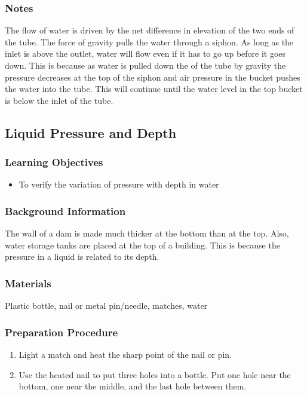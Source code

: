\subsubsection*{Notes}
The flow of water is driven by the net difference in elevation of the two ends of the tube. The force of gravity pulls the water through a siphon. As long as the inlet is above the outlet, water will flow even if it has to go up before it goes down. This is because as water is pulled down the of the tube by gravity the pressure decreases at the top of the siphon and air pressure in the bucket pushes the water into the tube. This will continue until the water level in the top bucket is below the inlet of the tube.

\subsection{Liquid Pressure and Depth}

\subsubsection*{Learning Objectives}
\begin{itemize}
\item{To verify the variation of pressure with depth in water} 
\end{itemize}

\subsubsection*{Background Information}
The wall of a dam is made much thicker at the bottom than at the top. Also, water storage tanks are placed at the top of a building. This is because the pressure in a liquid is related to its depth.

\subsubsection*{Materials}
Plastic bottle, nail or metal pin/needle, matches, water


\subsubsection*{Preparation Procedure}
\begin{enumerate}
\item{Light a match and heat the sharp point of the nail or pin.} 
\item{Use the heated nail to put three holes into a bottle. Put one hole near the bottom, one near the middle, and the last hole between them.} 
\end{enumerate}

